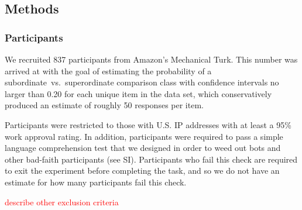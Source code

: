 \documentclass[doc]{apa6}
\newcommand{\red}[1]{\textcolor{Red}{#1}}
\begin{document}









\subsection{Methods}

\subsubsection{Participants}

We recruited 837 participants from Amazon's Mechanical Turk. 
This number was arrived at with the goal of estimating the probability of a subordinate~vs.~superordinate comparison class with confidence intervals no larger than 0.20 for each unique item in the data set, which conservatively produced an estimate of roughly 50 responses per item.

Participants were restricted to those with U.S. IP addresses with at least a 95\% work approval rating. 
In addition, participants were required to pass a simple language comprehension test that we designed in order to weed out bots and other bad-faith participants (see SI). 
Participants who fail this check are required to exit the experiment before completing the task, and so we do not have an estimate for how many participants fail this check. 

\red{describe other exclusion criteria}
\end{document}

